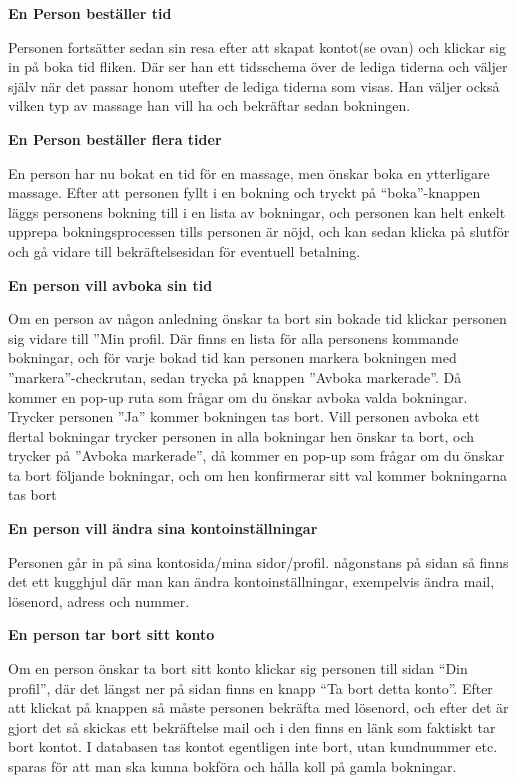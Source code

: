 \documentclass[11pt, titlepage, oneside, a4paper]{article}	%
\begin{document}
\textbf {En Person beställer tid}

Personen fortsätter sedan sin resa efter att skapat kontot(se ovan) och klickar sig in på boka tid fliken. Där ser han ett tidsschema över de lediga tiderna och väljer själv när det passar honom utefter de lediga tiderna som visas. Han väljer också vilken typ av massage han vill ha och bekräftar sedan bokningen.

\textbf {En Person beställer flera tider}

En person har nu bokat en tid för en massage, men önskar boka en ytterligare massage. Efter att personen fyllt i en bokning och tryckt på “boka”-knappen läggs personens bokning till i en lista av bokningar, och personen kan helt enkelt upprepa bokningsprocessen tills personen är nöjd, och kan sedan klicka på slutför och gå vidare till bekräftelsesidan för eventuell betalning.

\newpage
\textbf {En person vill avboka sin tid}

Om en person av någon anledning önskar ta bort sin bokade tid klickar personen sig vidare till ”Min profil. Där finns en lista för alla personens kommande bokningar, och för varje bokad tid kan personen markera bokningen med ”markera”-checkrutan, sedan trycka på knappen ”Avboka markerade”. Då kommer en pop-up ruta som frågar om du önskar avboka valda bokningar. Trycker personen ”Ja” kommer bokningen tas bort. Vill personen avboka ett flertal bokningar trycker personen in alla bokningar hen önskar ta bort, och trycker på ”Avboka markerade”, då kommer en pop-up som frågar om du önskar ta bort följande bokningar, och om hen konfirmerar sitt val kommer bokningarna tas bort

\textbf {En person vill ändra sina kontoinställningar}

Personen går in på sina kontosida/mina sidor/profil. någonstans på sidan så finns det ett kugghjul där man kan ändra kontoinställningar, exempelvis ändra mail, lösenord, adress och nummer.

\textbf {En person tar bort sitt konto }

Om en person önskar ta bort sitt konto klickar sig personen till sidan “Din profil”, där det längst ner på sidan finns en knapp “Ta bort detta konto”. Efter att klickat på knappen så måste personen bekräfta med lösenord, och efter det är gjort det så skickas ett bekräftelse mail och i den finns en länk som faktiskt tar bort kontot. I databasen tas kontot egentligen inte bort, utan kundnummer etc. sparas för att man ska kunna bokföra och hålla koll på gamla bokningar.
\end{document}
